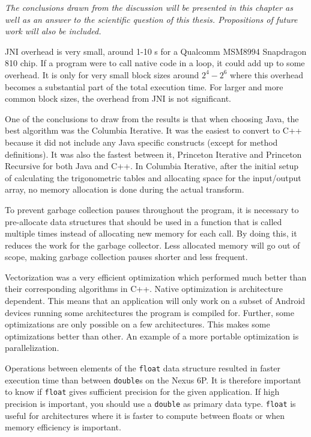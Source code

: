 \textit{The conclusions drawn from the discussion will be presented in this chapter as well as an answer to the scientific question of this thesis. Propositions of future work will also be included.}

JNI overhead is very small, around 1-10 \textmu s for a Qualcomm MSM8994 Snapdragon 810 chip. If a program were to call native code in a loop, it could add up to some overhead. It is only for very small block sizes around $2^4 - 2^6$ where this overhead becomes a substantial part of the total execution time. For larger and more common block sizes, the overhead from JNI is not significant.

One of the conclusions to draw from the results is that when choosing Java, the best algorithm was the Columbia Iterative. It was the easiest to convert to C++ because it did not include any Java specific constructs (except for method definitions). It was also the fastest between it, Princeton Iterative and Princeton Recursive for both Java and C++. In Columbia Iterative, after the initial setup of calculating the trigonometric tables and allocating space for the input/output array, no memory allocation is done during the actual transform.

To prevent garbage collection pauses throughout the program, it is necessary to pre-allocate data structures that should be used in a function that is called multiple times instead of allocating new memory for each call. By doing this, it reduces the work for the garbage collector. Less allocated memory will go out of scope, making garbage collection pauses shorter and less frequent.

Vectorization was a very efficient optimization which performed much better than their corresponding algorithms in C++. Native optimization is architecture dependent. This means that an application will only work on a subset of Android devices running some architectures the program is compiled for. Further, some optimizations are only possible on a few architectures. This makes some optimizations better than other. An example of a more portable optimization is parallelization.

Operations between elements of the \texttt{float} data structure resulted in faster execution time than between \texttt{double}s on the Nexus 6P. It is therefore important to know if \texttt{float} gives sufficient precision for the given application. If high precision is important, you should use a \texttt{double} as primary data type. \texttt{float} is useful for architectures where it is faster to compute between floats or when memory efficiency is important.

